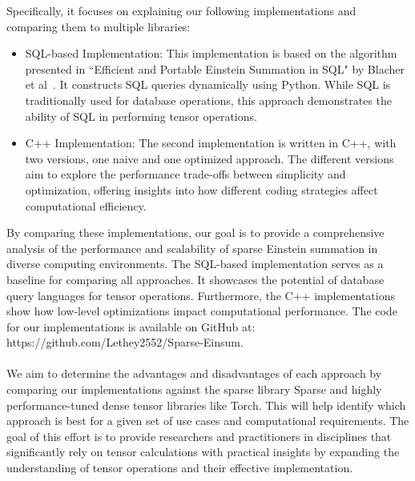 Specifically, it focuses on explaining our following implementations and comparing them
to multiple libraries:
%
\begin{itemize}
      \item SQL-based Implementation:
            This implementation is based on the algorithm presented in ``Efficient and
            Portable Einstein Summation in SQL" by Blacher et al~\cite{sql_einsum}.
            It constructs SQL queries dynamically using Python. While SQL is
            traditionally used for database operations, this approach demonstrates
            the ability of SQL in performing tensor operations.
      \item C++ Implementation: The second implementation is written in C++, with two
            versions, one naive and one optimized approach. The different versions
            aim to explore the performance trade-offs between simplicity and optimization,
            offering insights into how different coding strategies affect computational
            efficiency.
\end{itemize}
%
%
By comparing these implementations, our goal is to provide a comprehensive analysis of
the performance and scalability of sparse Einstein summation in diverse computing
environments. The SQL-based implementation serves as a baseline for comparing all
approaches. It showcases the potential of database query languages for tensor operations.
Furthermore, the C++ implementations show how low-level optimizations impact
computational performance. The code for our implementations is available on
GitHub at: https://github.com/Lethey2552/Sparse-Einsum.
\\
\\
We aim to determine the advantages and disadvantages of each approach by comparing
our implementations against the sparse library Sparse and highly performance-tuned
dense tensor libraries like Torch. This will help identify which approach is best
for a given set of use cases and computational requirements. The goal of this effort
is to provide researchers and practitioners in disciplines that significantly rely
on tensor calculations with practical insights by expanding the understanding of
tensor operations and their effective implementation.